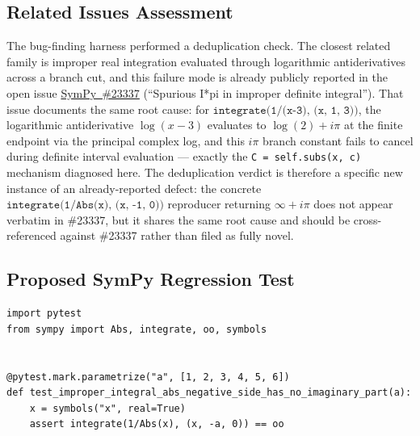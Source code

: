 \documentclass[11pt]{article}
\begin{document}
\subsection{Related Issues Assessment}

The bug-finding harness performed a deduplication check.  The closest related
family is improper real integration evaluated through logarithmic
antiderivatives across a branch cut, and this failure mode is already
publicly reported in the open issue
\href{https://github.com/sympy/sympy/issues/23337}{SymPy~\#23337}
(``Spurious I*pi in improper definite integral'').  That issue documents the
same root cause: for \(\texttt{integrate(1/(x-3), (x, 1, 3))}\), the
logarithmic antiderivative \(\log(x-3)\) evaluates to \(\log(2)+i\pi\) at the
finite endpoint via the principal complex log, and this \(i\pi\) branch
constant fails to cancel during definite interval evaluation --- exactly the
\texttt{C = self.subs(x, c)} mechanism diagnosed here.  The deduplication
verdict is therefore a specific new instance of an already-reported defect:
the concrete \(\texttt{integrate(1/Abs(x), (x, -1, 0))}\) reproducer returning
\(\infty+i\pi\) does not appear verbatim in \#23337, but it shares the same
root cause and should be cross-referenced against \#23337 rather than filed as
fully novel.

\subsection{Proposed SymPy Regression Test}

\medskip

\begin{lstlisting}[style=bugpython]
import pytest
from sympy import Abs, integrate, oo, symbols


@pytest.mark.parametrize("a", [1, 2, 3, 4, 5, 6])
def test_improper_integral_abs_negative_side_has_no_imaginary_part(a):
    x = symbols("x", real=True)
    assert integrate(1/Abs(x), (x, -a, 0)) == oo
\end{lstlisting}
\end{document}
